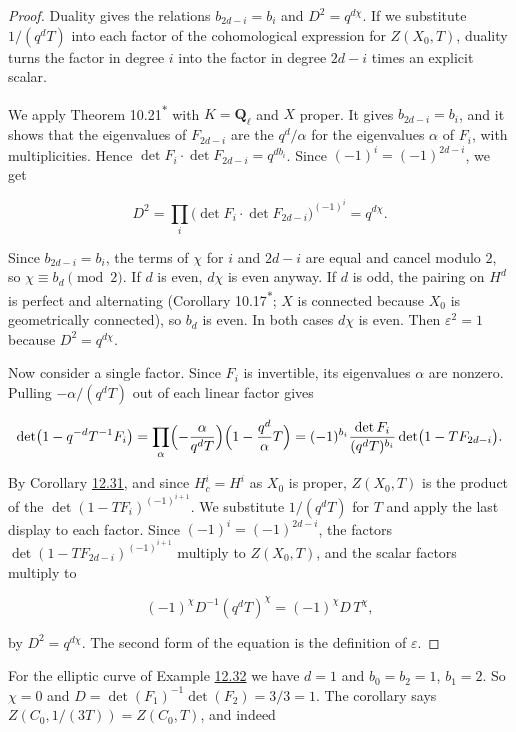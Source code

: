 \documentclass[11pt]{article}
\newcommand{\bpout}[1]{#1\textsuperscript{\hyperlink{bp-outside}{\ensuremath{\ast}}}}
\begin{document}
\begin{proof}[{Proof}]\label{bp101}%
Duality gives the relations \(b_{2d-i}=b_i\) and \(D^2=q^{d\chi}\). If we substitute \(1/(q^dT)\) into each factor of the cohomological expression for \(Z(X_0,T)\), duality turns the factor in degree \(i\) into the factor in degree \(2d-i\) times an explicit scalar.

We apply Theorem \bpout{10.21} with \(K=\mathbf Q_\ell\) and \(X\) proper. It gives \(b_{2d-i}=b_i\), and it shows that the eigenvalues of \(F_{2d-i}\) are the \(q^d/\alpha\) for the eigenvalues \(\alpha\) of \(F_i\), with multiplicities. Hence \(\det F_i\cdot\det F_{2d-i}=q^{db_i}\). Since \((-1)^i=(-1)^{2d-i}\), we get

\[
D^2=\prod_i\bigl(\det F_i\cdot\det F_{2d-i}\bigr)^{(-1)^i}
=q^{d\chi}.
\]

Since \(b_{2d-i}=b_i\), the terms of \(\chi\) for \(i\) and \(2d-i\) are equal and cancel modulo \(2\), so \(\chi\equiv b_d\pmod 2\). If \(d\) is even, \(d\chi\) is even anyway. If \(d\) is odd, the pairing on \(H^d\) is perfect and alternating (Corollary \bpout{10.17}; \(X\) is connected because \(X_0\) is geometrically connected), so \(b_d\) is even. In both cases \(d\chi\) is even. Then \(\varepsilon^2=1\) because \(D^2=q^{d\chi}\).

Now consider a single factor. Since \(F_i\) is invertible, its eigenvalues \(\alpha\) are nonzero. Pulling \(-\alpha/(q^dT)\) out of each linear factor gives

\[
\det\bigl(1-q^{-d}T^{-1}F_i\bigr)
=\prod_\alpha\Bigl(-\frac{\alpha}{q^dT}\Bigr)\Bigl(1-\frac{q^d}{\alpha}T\Bigr)
=(-1)^{b_i}\frac{\det F_i}{(q^dT)^{b_i}}\det\bigl(1-TF_{2d-i}\bigr).
\]

By Corollary \hyperref[bp95]{12.31}, and since \(H^i_c=H^i\) as \(X_0\) is proper, \(Z(X_0,T)\) is the product of the \(\det(1-TF_i)^{(-1)^{i+1}}\). We substitute \(1/(q^dT)\) for \(T\) and apply the last display to each factor. Since \((-1)^i=(-1)^{2d-i}\), the factors \(\det(1-TF_{2d-i})^{(-1)^{i+1}}\) multiply to \(Z(X_0,T)\), and the scalar factors multiply to

\[
(-1)^{\chi}D^{-1}(q^dT)^{\chi}=(-1)^{\chi}D\,T^{\chi},
\]

by \(D^2=q^{d\chi}\). The second form of the equation is the definition of \(\varepsilon\).
\end{proof}

\label{bp102}%
For the elliptic curve of Example \hyperref[bp98]{12.32} we have \(d=1\) and \(b_0=b_2=1\), \(b_1=2\). So \(\chi=0\) and \(D=\det(F_1)^{-1}\det(F_2)=3/3=1\). The corollary says \(Z(C_0,1/(3T))=Z(C_0,T)\), and indeed
\end{document}
